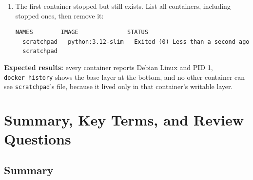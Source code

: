 \begin{enumerate}
\begin{codeblock}
  \end{codeblock}

  \begin{codeblock}
  \begin{Verbatim}[formatcom=\outputstyle]
  cat: /note.txt: No such file or directory
  \end{Verbatim}
  \end{codeblock}
\item
  The first container stopped but still exists. List all containers, including stopped ones, then remove it:

  \begin{codeblock}

\begin{Shaded}
\begin{Highlighting}[]
  
\end{Highlighting}
\end{Shaded}

  \end{codeblock}

  \begin{codeblock}
  \begin{Verbatim}[formatcom=\outputstyle]
  NAMES        IMAGE              STATUS
  scratchpad   python:3.12-slim   Exited (0) Less than a second ago
  scratchpad
  \end{Verbatim}
  \end{codeblock}
\end{enumerate}

\textbf{Expected results:} every container reports Debian Linux and PID 1, \texttt{docker\ history} shows the base layer at the bottom, and no other container can see \texttt{scratchpad}'s file, because it lived only in that container's writable layer.

\section{Summary, Key Terms, and Review Questions}\label{02-containers-shipping-the-whole-kitchen:summary-key-terms-and-review-questions}

\subsection*{Summary}\label{02-containers-shipping-the-whole-kitchen:summary}

